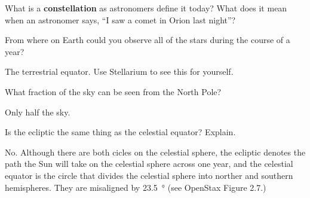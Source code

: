 \documentclass[addpoints]{exam}
\begin{document}
\begin{questions}
\begin{minipage}{0.50\textwidth}
\end{minipage}%

\question %
What is a \textbf{constellation} as astronomers define it today? What does it mean when an astronomer says, ``I saw a comet in Orion last night''?

\question %
From where on Earth could you observe all of the stars during the course of a year? 

\begin{solution}
The terrestrial equator. Use Stellarium to see this for yourself.
\end{solution}

\question
What fraction of the sky can be seen from the North Pole?

\begin{solution}
    Only half the sky.
\end{solution}






\question %
Is the ecliptic the same thing as the celestial equator? Explain.

\begin{solution}
    No. Although there are both cicles on the celestial sphere, the ecliptic denotes the path the Sun will take on the celestial sphere across one year, and the celestial equator is the circle that divides the celestial sphere into norther and southern hemispheres. They are misaligned by \SI{23.5}{\degree} (see OpenStax Figure 2.7.)
\end{solution}




\end{questions}
\end{document}

